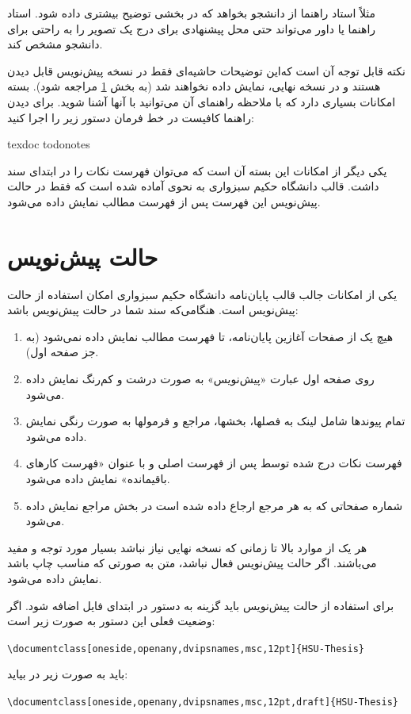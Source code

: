 مثلاً استاد راهنما از دانشجو بخواهد که در بخشی توضیح بیشتری داده شود. استاد راهنما یا داور می‌تواند حتی محل پیشنهادی برای درج یک تصویر را به راحتی برای دانشجو مشخص کند.

نکته قابل توجه آن است که‌این توضیحات حاشیه‌ای فقط در نسخه پیش‌نویس قابل دیدن هستند و در نسخه نهایی، نمایش داده نخواهند شد (به بخش 
\ref{Sec:draft}
مراجعه شود).
بسته 
امکانات بسیاری دارد که با ملاحظه راهنمای آن می‌توانید با آنها آشنا شوید. برای دیدن راهنما کافیست در خط فرمان دستور زیر را اجرا کنید:

\begin{latin}	
texdoc todonotes
\end{latin}	
یکی دیگر از امکانات این بسته آن است که می‌توان فهرست نکات را در ابتدای سند داشت.  قالب \پ دانشگاه حکیم سبزواری به نحوی آماده شده است که فقط در حالت پیش‌نویس این فهرست پس از فهرست مطالب نمایش داده می‌شود.



\section{حالت پیش‌نویس}\label{Sec:draft}
یکی از امکانات جالب قالب پایان‌نامه دانشگاه حکیم سبزواری امکان استفاده از حالت پیش‌نویس 
است. هنگامی‌که سند شما در حالت پیش‌نویس باشد:

\singlespacing
\begin{enumerate}
\item 
هیچ یک از صفحات آغازین پایان‌نامه، تا فهرست مطالب نمایش داده نمی‌شود (به جز صفحه اول).
\item
روی صفحه اول عبارت «پیش‌نویس» به صورت درشت و کم‌رنگ نمایش داده می‌شود.
\item
تمام پیوندها شامل لینک به فصلها، بخشها، مراجع و فرمولها به صورت رنگی نمایش داده می‌شود.
\item
فهرست نکات درج شده توسط
پس از فهرست اصلی و با عنوان «فهرست کارهای باقیمانده» نمایش داده می‌شود.
\item
شماره صفحاتی که به هر مرجع ارجاع داده شده است در بخش مراجع نمایش داده می‌شود.
\end{enumerate}
\doublespacing
هر یک از موارد بالا تا زمانی که نسخه نهایی \پ نیاز نباشد بسیار مورد توجه و مفید می‌باشند. 
 اگر حالت پیش‌نویس فعال نباشد، متن به صورتی که مناسب چاپ باشد نمایش داده می‌شود.

برای استفاده از حالت پیش‌نویس باید گزینه 
به دستور 
در ابتدای فایل 
اضافه شود. اگر وضعیت فعلی این دستور به صورت زیر است:
\begin{latin} \noindent
\verb!\documentclass[oneside,openany,dvipsnames,msc,12pt]{HSU-Thesis}!
\end{latin}
باید به صورت زیر در بیاید:
\begin{latin} \noindent
\verb!\documentclass[oneside,openany,dvipsnames,msc,12pt,draft]{HSU-Thesis}!
\end{latin}


